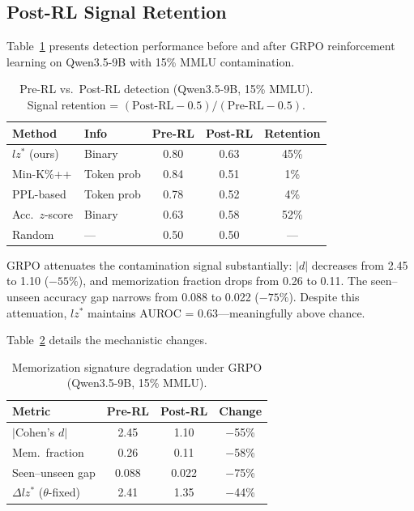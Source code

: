 \documentclass[11pt]{article}
\begin{document}
\subsection{Post-RL Signal Retention}
\label{sec:postrl}

Table~\ref{tab:postrl} presents detection performance before and after GRPO reinforcement learning on Qwen3.5-9B with 15\% MMLU contamination.

\begin{table}[t]
\centering
\caption{Pre-RL vs.\ Post-RL detection (Qwen3.5-9B, 15\% MMLU). Signal retention = $(\text{Post-RL} - 0.5) / (\text{Pre-RL} - 0.5)$.}
\label{tab:postrl}
\small
\begin{tabular}{llccc}
\toprule
Method & Info & Pre-RL & Post-RL & Retention \\
\midrule
$lz^*$ (ours) & Binary & 0.80 & 0.63 & 45\% \\
Min-K\%++ & Token prob & 0.84 & 0.51 & 1\% \\
PPL-based & Token prob & 0.78 & 0.52 & 4\% \\
Acc.\ $z$-score & Binary & 0.63 & 0.58 & 52\% \\
Random & --- & 0.50 & 0.50 & --- \\
\bottomrule
\end{tabular}
\end{table}

GRPO attenuates the contamination signal substantially: $|d|$ decreases from 2.45 to 1.10 ($-55\%$), and memorization fraction drops from 0.26 to 0.11.
The seen--unseen accuracy gap narrows from 0.088 to 0.022 ($-75\%$).
Despite this attenuation, $lz^*$ maintains AUROC = 0.63---meaningfully above chance.

Table~\ref{tab:postrl_detail} details the mechanistic changes.

\begin{table}[t]
\centering
\caption{Memorization signature degradation under GRPO (Qwen3.5-9B, 15\% MMLU).}
\label{tab:postrl_detail}
\small
\begin{tabular}{lccc}
\toprule
Metric & Pre-RL & Post-RL & Change \\
\midrule
$|$Cohen's $d|$ & 2.45 & 1.10 & $-$55\% \\
Mem.\ fraction & 0.26 & 0.11 & $-$58\% \\
Seen--unseen gap & 0.088 & 0.022 & $-$75\% \\
$\Delta lz^*$ ($\theta$-fixed) & 2.41 & 1.35 & $-$44\% \\
\bottomrule
\end{tabular}
\end{table}
\end{document}
